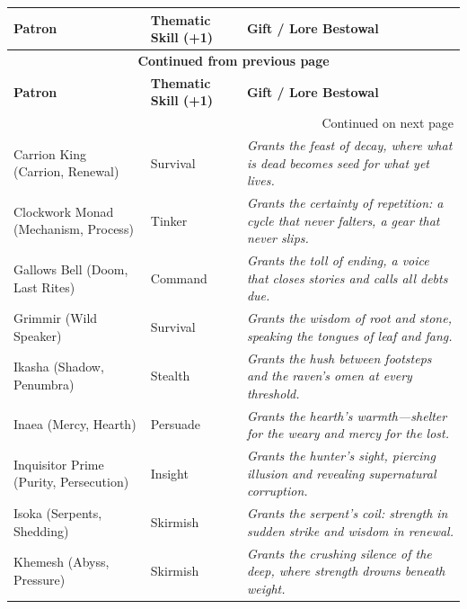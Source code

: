 \begin{longtable}{@{}p{4.2cm}p{3.2cm}p{7.2cm}@{}}
\toprule
\textbf{Patron} & \textbf{Thematic Skill (+1)} & \textbf{Gift / Lore Bestowal} \\
\midrule
\endfirsthead

\multicolumn{3}{c}{{\bfseries Continued from previous page}} \\
\toprule
\textbf{Patron} & \textbf{Thematic Skill (+1)} & \textbf{Gift / Lore Bestowal} \\
\midrule
\endhead

\midrule
\multicolumn{3}{r}{{Continued on next page}} \\
\endfoot

\bottomrule
\endlastfoot

Carrion King (Carrion, Renewal) & Survival &
\emph{Grants the feast of decay, where what is dead becomes seed for what yet lives.} \\

Clockwork Monad (Mechanism, Process) & Tinker &
\emph{Grants the certainty of repetition: a cycle that never falters, a gear that never slips.} \\

Gallows Bell (Doom, Last Rites) & Command &
\emph{Grants the toll of ending, a voice that closes stories and calls all debts due.} \\

Grimmir (Wild Speaker) & Survival &
\emph{Grants the wisdom of root and stone, speaking the tongues of leaf and fang.} \\

Ikasha (Shadow, Penumbra) & Stealth &
\emph{Grants the hush between footsteps and the raven's omen at every threshold.} \\

Inaea (Mercy, Hearth) & Persuade &
\emph{Grants the hearth's warmth---shelter for the weary and mercy for the lost.} \\

Inquisitor Prime (Purity, Persecution) & Insight &
\emph{Grants the hunter's sight, piercing illusion and revealing supernatural corruption.} \\

Isoka (Serpents, Shedding) & Skirmish &
\emph{Grants the serpent's coil: strength in sudden strike and wisdom in renewal.} \\

Khemesh (Abyss, Pressure) & Skirmish &
\emph{Grants the crushing silence of the deep, where strength drowns beneath weight.} \\


\end{longtable}
